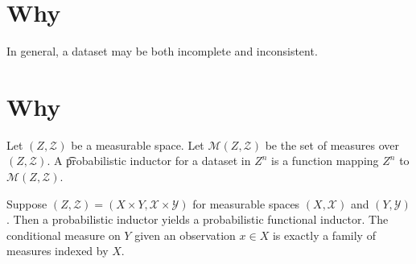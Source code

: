 

\section*{Why}

In general, a dataset may be both incomplete and inconsistent.

\section*{Why}

Let $(Z, \mathcal{Z} )$ be a measurable space.
Let $\mathcal{M} (Z, \mathcal{Z} )$ be the set of measures over $(Z, \mathcal{Z} )$.
A \t{probabilistic inductor} for a dataset in $Z^n$ is a function mapping $Z^n$ to $\mathcal{M} (Z, \mathcal{Z} )$.

Suppose $(Z, \mathcal{Z} ) = (X \times  Y, \mathcal{X}  \times \mathcal{Y} )$ for measurable spaces $(X, \mathcal{X} )$ and $(Y, \mathcal{Y} )$.
Then a probabilistic inductor yields a probabilistic functional inductor.
The conditional measure on $Y$ given an observation $x \in X$ is exactly a family of measures indexed by $X$.

\blankpage